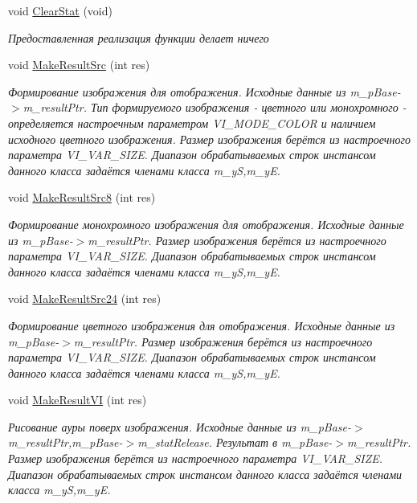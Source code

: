 \begin{DoxyCompactItemize}
void \hyperlink{class_c_v_i_engine_thread_a608a3c62caea2e713736b5b8efd2f6ea}{Clear\+Stat} (void)
\begin{DoxyCompactList}\small\item\em Предоставленная реализация функции делает ничего \end{DoxyCompactList}\item 
void \hyperlink{class_c_v_i_engine_thread_a36b1ea71981bd36fa9545fa68e98e78b}{Make\+Result\+Src} (int res)
\begin{DoxyCompactList}\small\item\em Формирование изображения для отображения. Исходные данные из m\+\_\+p\+Base-\/$>$m\+\_\+result\+Ptr. Тип формируемого изображения -\/ цветного или монохромного -\/ определяется настроечным параметром V\+I\+\_\+\+M\+O\+D\+E\+\_\+\+C\+O\+L\+O\+R и наличием исходного цветного изображения. Размер изображения берётся из настроечного параметра V\+I\+\_\+\+V\+A\+R\+\_\+\+S\+I\+Z\+E. Диапазон обрабатываемых строк инстансом данного класса задаётся членами класса m\+\_\+y\+S,m\+\_\+y\+E. \end{DoxyCompactList}\item 
void \hyperlink{class_c_v_i_engine_thread_a30b43140ec42578567286895a960cb4f}{Make\+Result\+Src8} (int res)
\begin{DoxyCompactList}\small\item\em Формирование монохромного изображения для отображения. Исходные данные из m\+\_\+p\+Base-\/$>$m\+\_\+result\+Ptr. Размер изображения берётся из настроечного параметра V\+I\+\_\+\+V\+A\+R\+\_\+\+S\+I\+Z\+E. Диапазон обрабатываемых строк инстансом данного класса задаётся членами класса m\+\_\+y\+S,m\+\_\+y\+E. \end{DoxyCompactList}\item 
void \hyperlink{class_c_v_i_engine_thread_a3df2d213ef88168193cabc7a6bad8c6c}{Make\+Result\+Src24} (int res)
\begin{DoxyCompactList}\small\item\em Формирование цветного изображения для отображения. Исходные данные из m\+\_\+p\+Base-\/$>$m\+\_\+result\+Ptr. Размер изображения берётся из настроечного параметра V\+I\+\_\+\+V\+A\+R\+\_\+\+S\+I\+Z\+E. Диапазон обрабатываемых строк инстансом данного класса задаётся членами класса m\+\_\+y\+S,m\+\_\+y\+E. \end{DoxyCompactList}\item 
void \hyperlink{class_c_v_i_engine_thread_a02bac0a7df7e985164b867ea3433bb40}{Make\+Result\+V\+I} (int res)
\begin{DoxyCompactList}\small\item\em Рисование ауры поверх изображения. Исходные данные из m\+\_\+p\+Base-\/$>$m\+\_\+result\+Ptr,m\+\_\+p\+Base-\/$>$m\+\_\+stat\+Release. Результат в m\+\_\+p\+Base-\/$>$m\+\_\+result\+Ptr. Размер изображения берётся из настроечного параметра V\+I\+\_\+\+V\+A\+R\+\_\+\+S\+I\+Z\+E. Диапазон обрабатываемых строк инстансом данного класса задаётся членами класса m\+\_\+y\+S,m\+\_\+y\+E. \end{DoxyCompactList}\item 

\end{DoxyCompactItemize}
